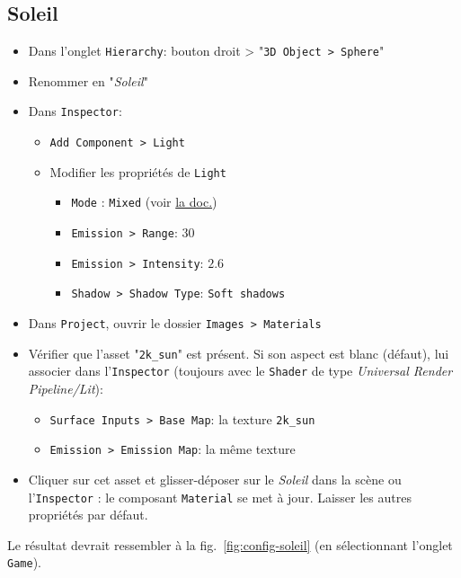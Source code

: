 \documentclass[a4paper,10pt]{article}
\newenvironment{solution}%
{\begin{tcolorbox}[breakable,colback=red!5!white,colframe=red!75!black,title=Solution]}%
{\end{tcolorbox}}
\begin{document}
\ifversionenseignant
\begin{solution}
	\subsection{Soleil}
	
	\begin{itemize}
		\item Dans l'onglet \texttt{Hierarchy}:  bouton droit > "\texttt{3D Object > Sphere}"
		\item Renommer en "\textit{Soleil}"
		\item Dans \texttt{Inspector}:
		\begin{itemize}
			\item \texttt{Add Component > Light}
			\item Modifier les propriétés de \texttt{Light}
			\begin{itemize}				
				\item \texttt{Mode} : \texttt{Mixed} (voir \href{https://docs.unity3d.com/Manual/LightMode-Mixed.html}{la doc.})
				\item \texttt{Emission > Range}: $30$
				\item \texttt{Emission > Intensity}: $2.6$
				\item \texttt{Shadow > Shadow Type}: \texttt{Soft shadows}
			\end{itemize}
		\end{itemize}
		\item Dans \texttt{Project}, ouvrir le dossier \texttt{Images > Materials}
		\item Vérifier que l'asset "\texttt{2k\_sun}" est présent. Si son aspect est blanc (défaut), lui associer dans l'\texttt{Inspector} (toujours avec le  \texttt{Shader} de type \textit{Universal Render Pipeline/Lit}):
		\begin{itemize}
			\item \texttt{Surface Inputs > Base Map}: la texture \texttt{2k\_sun}
			\item \texttt{Emission > Emission Map}: la même texture
		\end{itemize}
		\item Cliquer sur cet asset et glisser-déposer sur le \textit{Soleil} dans la scène ou l'\texttt{Inspector} : le composant \texttt{Material} se met à jour. Laisser les autres propriétés par défaut.
	\end{itemize}

Le résultat devrait ressembler à la fig.~\ref{fig:config-soleil} (en sélectionnant l'onglet \texttt{Game}).
\end{solution}
\end{document}
